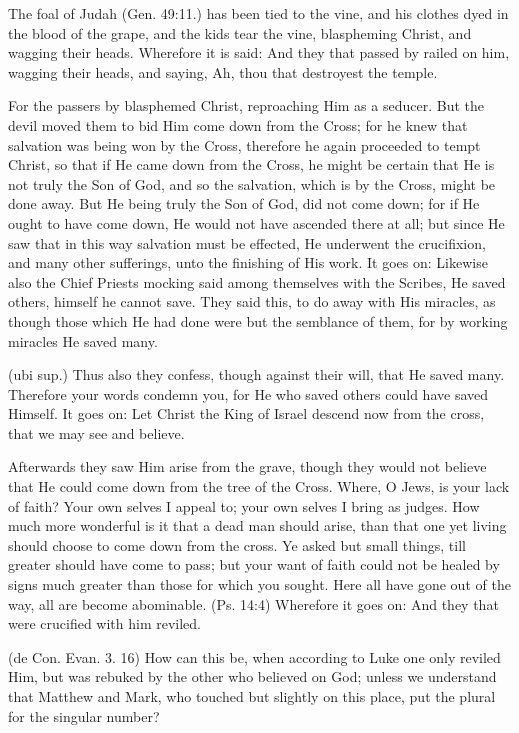  The foal of Judah (Gen. 49:11.) has been tied to the vine, and his clothes dyed in the blood of the grape, and the kids tear the vine, blaspheming Christ, and wagging their heads. Wherefore it is said: And they that passed by railed on him, wagging their heads, and saying, Ah, thou that destroyest the temple.

 For the passers by blasphemed Christ, reproaching Him as a seducer. But the devil moved them to bid Him come down from the Cross; for he knew that salvation was being won by the Cross, therefore he again proceeded to tempt Christ, so that if He came down from the Cross, he might be certain that He is not truly the Son of God, and so the salvation, which is by the Cross, might be done away. But He being truly the Son of God, did not come down; for if He ought to have come down, He would not have ascended there at all; but since He saw that in this way salvation must be effected, He underwent the crucifixion, and many other sufferings, unto the finishing of His work. It goes on: Likewise also the Chief Priests mocking said among themselves with the Scribes, He saved others, himself he cannot save. They said this, to do away with His miracles, as though those which He had done were but the semblance of them, for by working miracles He saved many.

 (ubi sup.) Thus also they confess, though against their will, that He saved many. Therefore your words condemn you, for He who saved others could have saved Himself. It goes on: Let Christ the King of Israel descend now from the cross, that we may see and believe.

 Afterwards they saw Him arise from the grave, though they would not believe that He could come down from the tree of the Cross. Where, O Jews, is your lack of faith? Your own selves I appeal to; your own selves I bring as judges. How much more wonderful is it that a dead man should arise, than that one yet living should choose to come down from the cross. Ye asked but small things, till greater should have come to pass; but your want of faith could not be healed by signs much greater than those for which you sought. Here all have gone out of the way, all are become abominable. (Ps. 14:4) Wherefore it goes on: And they that were crucified with him reviled.

 (de Con. Evan. 3. 16) How can this be, when according to Luke one only reviled Him, but was rebuked by the other who believed on God; unless we understand that Matthew and Mark, who touched but slightly on this place, put the plural for the singular number?


